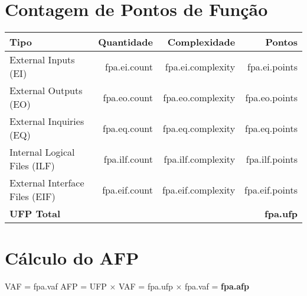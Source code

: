 \section{Contagem de Pontos de Função}

\begin{table}[H]
\centering
\begin{tabular}{lrrr}
\toprule
Tipo & Quantidade & Complexidade & Pontos \\
\midrule
External Inputs (EI) & {{ fpa.ei.count }} & {{ fpa.ei.complexity }} & {{ fpa.ei.points }} \\
External Outputs (EO) & {{ fpa.eo.count }} & {{ fpa.eo.complexity }} & {{ fpa.eo.points }} \\
External Inquiries (EQ) & {{ fpa.eq.count }} & {{ fpa.eq.complexity }} & {{ fpa.eq.points }} \\
Internal Logical Files (ILF) & {{ fpa.ilf.count }} & {{ fpa.ilf.complexity }} & {{ fpa.ilf.points }} \\
External Interface Files (EIF) & {{ fpa.eif.count }} & {{ fpa.eif.complexity }} & {{ fpa.eif.points }} \\
\midrule
\textbf{UFP Total} & & & \textbf{{{ fpa.ufp }}} \\
\bottomrule
\end{tabular}
\end{table}

\section{Cálculo do AFP}
VAF = {{ fpa.vaf }}
AFP = UFP × VAF = {{ fpa.ufp }} × {{ fpa.vaf }} = \textbf{{{ fpa.afp }}}